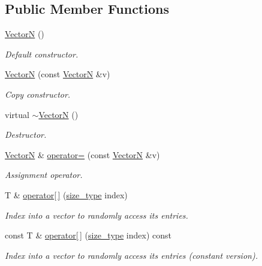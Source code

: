 \subsection*{\-Public \-Member \-Functions}
\begin{DoxyCompactItemize}
\item 
\hyperlink{classmetrobotics_1_1VectorN_afc3501199479358dd0b0508380c51a0c}{\-Vector\-N} ()
\begin{DoxyCompactList}\small\item\em \-Default constructor. \end{DoxyCompactList}\item 
\hyperlink{classmetrobotics_1_1VectorN_a4f882a56e997f0f78cfaa368e24894b5}{\-Vector\-N} (const \hyperlink{classmetrobotics_1_1VectorN}{\-Vector\-N} \&v)
\begin{DoxyCompactList}\small\item\em \-Copy constructor. \end{DoxyCompactList}\item 
virtual \hyperlink{classmetrobotics_1_1VectorN_a511d1f0cd80ea02dbb6c33c0aa6e5d58}{$\sim$\-Vector\-N} ()
\begin{DoxyCompactList}\small\item\em \-Destructor. \end{DoxyCompactList}\item 
\hyperlink{classmetrobotics_1_1VectorN}{\-Vector\-N} \& \hyperlink{classmetrobotics_1_1VectorN_a0dbd50fcedc5437ac50942008d11ec47}{operator=} (const \hyperlink{classmetrobotics_1_1VectorN}{\-Vector\-N} \&v)
\begin{DoxyCompactList}\small\item\em \-Assignment operator. \end{DoxyCompactList}\item 
\-T \& \hyperlink{classmetrobotics_1_1VectorN_a795054c9a1a6d0bb0c7a551562b392b0}{operator\mbox{[}$\,$\mbox{]}} (\hyperlink{classmetrobotics_1_1VectorN_a596373b71834214f1c36015df71f3424}{size\-\_\-type} index)
\begin{DoxyCompactList}\small\item\em \-Index into a vector to randomly access its entries. \end{DoxyCompactList}\item 
const \-T \& \hyperlink{classmetrobotics_1_1VectorN_ab0d113ec207427d7f987dd6f47a32879}{operator\mbox{[}$\,$\mbox{]}} (\hyperlink{classmetrobotics_1_1VectorN_a596373b71834214f1c36015df71f3424}{size\-\_\-type} index) const 
\begin{DoxyCompactList}\small\item\em \-Index into a vector to randomly access its entries (constant version). \end{DoxyCompactList}\end{DoxyCompactItemize}
